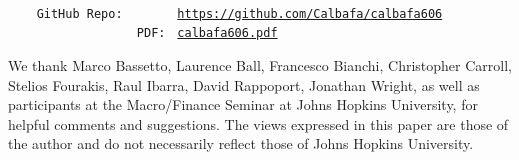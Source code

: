 \documentclass[\latexroot/\projectname]{subfiles}
\begin{document}
\whenintegrated{\label{links}} %

\providecommand{\REMARK}{\href{https://github.com/econ-ark/REMARK}{REMARK}}
\begin{footnotesize}
  \setlength{\parskip}{0pt}
  \parbox{0.9\textwidth}{
    \begin{tabbing}
      \texttt{~~~~~~~~~~~~~~~~~~~~~~~} \= \=  \\
      \texttt{~~~~GitHub~Repo:~~~~~~~} \> \> \texttt{\href{https://github.com/Calbafa/calbafa606}{https://github.com/Calbafa/calbafa606}} \\
      \texttt{~~~~~~~~~~~~~~~~~~PDF:~} \> \> \texttt{\href{https://github.com/Calbafa/calbafa606/blob/master/calbafa606.pdf}{calbafa606.pdf}} \\
    \end{tabbing}
  }
\end{footnotesize}
\vspace{-0.3\baselineskip}




\vspace{-0.3\baselineskip}



\newcommand{\thanksInput}[1]{%
  \IfFileExists{\latexroot/Subfiles/#1.tex}%
  {\ignorespaces\unskip}%
  {}%
}%

\whenintegrated{\label{funding-info}} %
\vspace{0.3\baselineskip}
\begin{minipage}{\textwidth}
  \footnotesize We thank Marco Bassetto, Laurence Ball, Francesco Bianchi, Christopher Carroll, Stelios Fourakis, Raul Ibarra, David Rappoport, Jonathan Wright, as well as participants at the Macro/Finance Seminar at Johns Hopkins University, for helpful comments and suggestions. The views expressed in this paper are those of the author and do not necessarily reflect those of Johns Hopkins University.
\end{minipage}


\titlepagefinish

\smartbib
\end{document}
